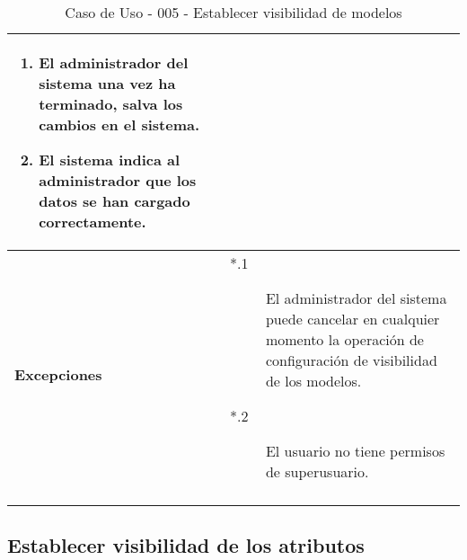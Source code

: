 \begin{center}
\begin{longtable}{||p{3.4cm}|p{12cm}||}
\begin{enumerate}
                \item El administrador del sistema una vez ha terminado, salva
                       los cambios en el sistema.
                \item El sistema indica al administrador que los datos se han
                       cargado correctamente.
             \end{enumerate}\\
 \hline \bf Excepciones &
             \begin{description}
                \item[*.1] El administrador del sistema puede cancelar en
                          cualquier momento la operación de configuración de
                          visibilidad de los modelos.
                \item[*.2] El usuario no tiene permisos de superusuario.
             \end{description}\\
\hline
\hline
\caption{\label{tab:caso005} Caso de Uso - 005 - Establecer visibilidad de modelos} 
\end{longtable}
\end{center}


\subsection{Establecer visibilidad de los atributos}

